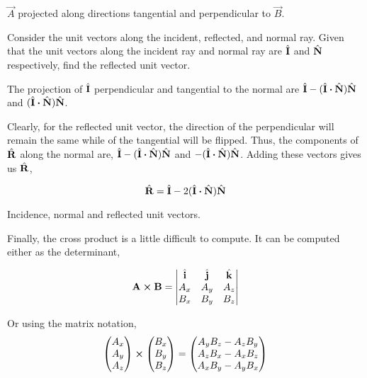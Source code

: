\begin{marginfigure}
    \centering
    \caption{\(\vec{A}\) projected along directions tangential and 
    perpendicular to \(\vec{B}\).}
    \label{fig: vectproject}
\end{marginfigure}


\begin{example}
    Consider the unit vectors along the incident, reflected, and normal ray.
    Given that the unit vectors along the incident ray and normal ray are 
    \(\hat{\boldsymbol{\mathbf{I}}}\) and \(\hat{\boldsymbol{\mathbf{N}}}\) respectively, find the reflected unit vector.
    
    \begin{soln}
        The projection of \(\hat{\boldsymbol{\mathbf{I}}}\) perpendicular and tangential to the 
        normal are \(\unitv{I} - (\unitv{I} \dtp \unitv{N})\unitv{N}\) and \((\unitv{I} \dtp \unitv{N})\unitv{N}\).

        Clearly, for the reflected unit vector, the direction of the perpendicular will remain the same 
        while of the tangential will be flipped. Thus, the components of 
        \(\hat{\boldsymbol{\mathbf{R}}}\) along the normal are, \(\unitv{I} - (\unitv{I} \dtp \unitv{N})\unitv{N}\)
        and \(-(\unitv{I} \dtp \unitv{N})\unitv{N}\). Adding these vectors gives us \(\hat{\boldsymbol{\mathbf{R}}}\),

        \begin{equation*}
            \unitv{R} = \unitv{I} - 2(\unitv{I} \dtp \unitv{N})\unitv{N}
        \end{equation*}
    \end{soln}
\end{example}

\begin{marginfigure}
    \centering
    \caption{Incidence, normal and reflected unit vectors.}
\end{marginfigure}


Finally, the cross product is a little difficult to compute.
It can be computed either as the determinant,

\[\Aa \cp \BB =
\begin{vmatrix}
    \unitv{i} & \unitv{j} & \unitv{k} \\
    A_x & A_y & A_z \\
    B_x & B_y & B_z
\end{vmatrix}\]

Or using the matrix notation,
\[
\begin{pmatrix}
    A_x \\
    A_y \\
    A_z
\end{pmatrix} \cp
%
\begin{pmatrix}
    B_x \\
    B_y \\
    B_z
\end{pmatrix}
%
=
%
\begin{pmatrix}
    A_yB_z - A_zB_y \\
    A_zB_x - A_xB_z \\
    A_xB_y - A_yB_x
\end{pmatrix}
\]

